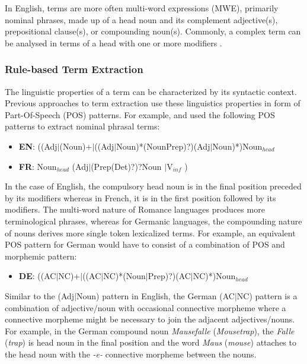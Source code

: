 In English, terms are more often multi-word expressions (MWE), primarily nominal phrases, made up of a head noun and its complement adjective(s), prepositional clause(s), or compounding noun(s). Commonly, a complex term can be analysed in terms of a head with one or more modifiers \citep{hippisley2005head}.

\subsubsection{Rule-based Term Extraction}

The linguistic properties of a term can be characterized by its syntactic context. Previous approaches to term extraction use these linguistics properties in form of Part-Of-Speech (POS) patterns. For example, \cite{justeson1995} and \cite{daille1996} used the following POS patterns to extract nominal phrasal terms:
\begin{itemize}
\item[] \textbf{EN}: ((Adj$\vert$(Noun)+$\vert$((Adj$\vert$Noun)*(NounPrep)?)(Adj$\vert$Noun)*)Noun$_{head}$
\item[] \textbf{FR}: Noun$_{head}$ (Adj$\vert$(Prep(Det)?)?Noun $\vert$V$_{inf}$ )
\end{itemize}
In the case of English, the compulsory head noun is in the final position preceded by its modifiers whereas in French, it is in the first position followed by its modifiers. The multi-word nature of Romance languages produces more terminological phrases, whereas for Germanic languages, the compounding nature of nouns derives more single token lexicalized terms. For example, an equivalent POS pattern for German would have to consist of a combination of POS and morphemic pattern:

\begin{itemize}
\item[] \textbf{DE}: ((AC$\vert$NC)+$\vert$((AC$\vert$NC)*(Noun$\vert$Prep)?)(AC$\vert$NC)*)Noun$_{head}$
\end{itemize}

\noindent Similar to the (Adj$\vert$Noun) pattern in English, the German (AC$\vert$NC) pattern is a combination of adjective/noun with occasional connective morpheme where a connective morpheme might be necessary to join the adjacent adjectives/nouns. For example, in the German compound noun \emph{Mausefalle} (\emph{Mousetrap}), the \emph{Falle} (\emph{trap}) is head noun in the final position and the word \emph{Maus} (\emph{mouse}) attaches to the head noun with the \emph{-e-} connective morpheme between the nouns.

